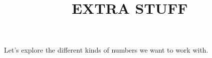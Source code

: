 \documentclass{ximera}
\title{EXTRA STUFF}
\begin{document}
\begin{abstract}
\end{abstract}
\maketitle

Let's explore the different kinds of numbers we want to work with.
\end{document}
